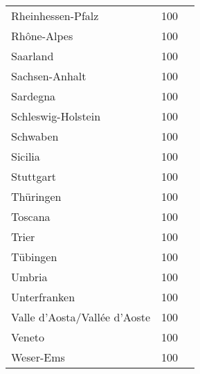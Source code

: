 \begin{table}[H]
\begin{tabularx}{\textwidth}{Xcc}
            Rheinhessen-Pfalz & 100 \\
            Rhône-Alpes & 100 \\
            Saarland & 100 \\
            Sachsen-Anhalt & 100 \\
            Sardegna & 100 \\
            Schleswig-Holstein & 100 \\
            Schwaben & 100 \\
            Sicilia & 100 \\
            Stuttgart & 100 \\
            Thüringen & 100 \\
            Toscana & 100 \\
            Trier & 100 \\
            Tübingen & 100 \\
            Umbria & 100 \\
            Unterfranken & 100 \\
            Valle d’Aosta/Vallée d’Aoste & 100 \\
            Veneto & 100 \\
            Weser-Ems & 100 \\
        \bottomrule
    \end{tabularx}
\end{table}
        